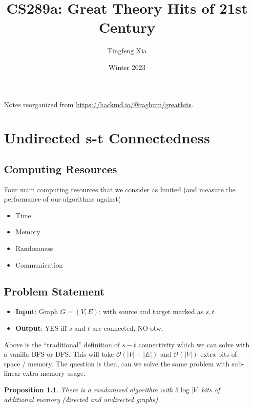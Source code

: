 \documentclass[11pt, letter]{book}
\author{Tingfeng Xia}
\title{CS289a: Great Theory Hits of 21st Century}
\date{Winter 2023}
\newtheorem{proposition}{Proposition}[chapter]
\begin{document}
\maketitle

\vspace*{\fill}
Notes reorganized from \url{https://hackmd.io/@raghum/greathits}.\newline \newline 
\doclicenseThis

\tableofcontents

\chapter{Undirected s-t Connectedness}

\section{Computing Resources}
Four main computing resources that we consider as limited (and measure the performance of our algorithms against)
\begin{itemize}
	\item Time 
	\item Memory
	\item Randomness
	\item Communication
\end{itemize}

\section{Problem Statement}

\begin{itemize}
	\item \textbf{Input}: Graph $G = (V, E)$; with source and target marked as $s, t$
	\item \textbf{Output}: YES iff $s$ and $t$ are connected, NO otw.
\end{itemize}

Above is the ``traditional'' definition of $s-t$ connectivity which we can solve with a vanilla BFS or DFS. This will take $\mathcal O ( |V| + |E| ) $ and $\mathcal O (|V| )$ extra bits of space / memory. The question is then, can we solve the same problem with sub-linear extra memory usage. 

\begin{proposition}
	There is a randomized algorithm with $5 \log |V|$ bits of additional memory (directed and undirected graphs). 
\end{proposition}
\end{document}
